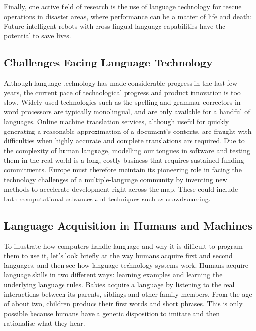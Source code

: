 \documentclass[]{../../metanetpaper}
\begin{document}
\begin{multicols}{2}
Finally, one active field of research is the use of language technology for
rescue operations in disaster areas, where performance can be a matter of life
and death: Future intelligent robots with cross-lingual language capabilities
have the potential to save lives.

\subsection{Challenges Facing Language Technology}

Although language technology has made considerable progress in the last few
years, the current pace of technological progress and product innovation is too
slow. Widely-used technologies such as the spelling and grammar correctors in
word processors are typically monolingual, and are only available for a handful
of languages. Online machine translation services, although useful for quickly
generating a reasonable approximation of a document’s contents, are fraught
with difficulties when highly accurate and complete translations are required.
Due to the complexity of human language, modelling our tongues in software and
testing them in the real world is a long, costly business that requires
sustained funding commitments. Europe must therefore maintain its pioneering
role in facing the technology challenges of a multiple-language community by
inventing new methods to accelerate development right across the map. These
could include both computational advances and techniques such as crowdsourcing.

\subsection{Language Acquisition in Humans and Machines}

To illustrate how computers handle language and why it is difficult to program
them to use it, let’s look briefly at the way humans acquire first and second
languages, and then see how language technology systems work.
Humans acquire language skills in two different ways: learning
examples and learning the underlying language rules. Babies acquire a
language by listening to the real interactions between its parents,
siblings and other family members. From the age of about two, children
produce their first words and short phrases. This is only possible
because humans have a genetic disposition to imitate and then
rationalise what they hear.


\end{multicols}
\end{document}
